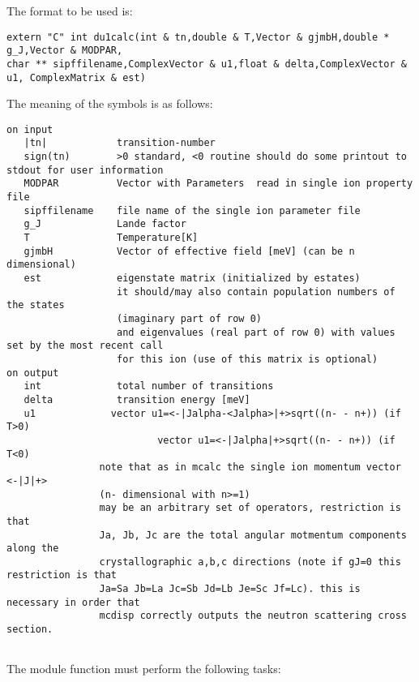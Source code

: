 The format to be used is:
{\footnotesize
\begin{verbatim}
extern "C" int du1calc(int & tn,double & T,Vector & gjmbH,double * g_J,Vector & MODPAR,
char ** sipffilename,ComplexVector & u1,float & delta,ComplexVector & u1, ComplexMatrix & est)
\end{verbatim}

The meaning of the symbols is as follows:

\begin{verbatim}
on input
   |tn|            transition-number  
   sign(tn)        >0 standard, <0 routine should do some printout to stdout for user information
   MODPAR          Vector with Parameters  read in single ion property file
   sipffilename    file name of the single ion parameter file
   g_J             Lande factor
   T               Temperature[K]
   gjmbH           Vector of effective field [meV] (can be n dimensional)
   est             eigenstate matrix (initialized by estates)
                   it should/may also contain population numbers of the states
				   (imaginary part of row 0)
                   and eigenvalues (real part of row 0) with values set by the most recent call
				   for this ion (use of this matrix is optional)
on output
   int             total number of transitions
   delta           transition energy [meV]
   u1             vector u1=<-|Jalpha-<Jalpha>|+>sqrt((n- - n+)) (if T>0)
                          vector u1=<-|Jalpha|+>sqrt((n- - n+)) (if T<0)
                note that as in mcalc the single ion momentum vector <-|J|+> 
				(n- dimensional with n>=1)
                may be an arbitrary set of operators, restriction is that 
                Ja, Jb, Jc are the total angular motmentum components along the
                crystallographic a,b,c directions (note if gJ=0 this restriction is that
                Ja=Sa Jb=La Jc=Sb Jd=Lb Je=Sc Jf=Lc). this is necessary in order that
                mcdisp correctly outputs the neutron scattering cross section.
				
\end{verbatim}
}
The module function must perform the following tasks:
